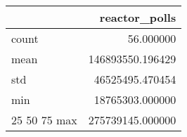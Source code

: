 \begin{tabular}{lr}
\toprule
 & reactor\_polls \\
\midrule
count & 56.000000 \\
mean & 146893550.196429 \\
std & 46525495.470454 \\
min & 18765303.000000 \\
25%
50%
75%
max & 275739145.000000 \\
\bottomrule
\end{tabular}

